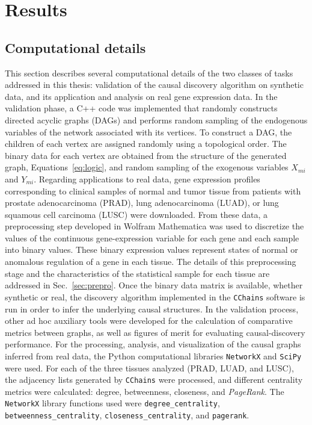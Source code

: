 \documentclass[12pt,a4paper]{report}
\begin{document}
\newpage


\chapter{Results}
\section{Computational details}

This section describes several computational details of the two classes of tasks addressed in this thesis: validation of the causal discovery algorithm on synthetic data, and its application and analysis on real gene expression data. In the validation phase, a C++ code was implemented that randomly constructs directed acyclic graphs (DAGs) and performs random sampling of the endogenous variables of the network associated with its vertices. To construct a DAG, the children of each vertex are assigned randomly using a topological order. The binary data for each vertex are obtained from the structure of the generated graph, Equations~\ref{eq:logic}, and random sampling of the exogenous variables $X_{mi}$ and $Y_{mi}$. Regarding applications to real data, gene expression profiles corresponding to clinical samples of normal and tumor tissue from patients with prostate adenocarcinoma (PRAD), lung adenocarcinoma (LUAD), or lung squamous cell carcinoma (LUSC) were downloaded\cite{prad,luad,lusc}. From these data, a preprocessing step developed in Wolfram Mathematica was used to discretize the values of the continuous gene-expression variable for each gene and each sample into binary values. These binary expression values represent states of normal or anomalous regulation of a gene in each tissue. The details of this preprocessing stage and the characteristics of the statistical sample for each tissue are addressed in Sec.~\ref{sec:prepro}. Once the binary data matrix is available, whether synthetic or real, the discovery algorithm implemented in the \texttt{CChains} software is run in order to infer the underlying causal structures. In the validation process, other ad hoc auxiliary tools were developed for the calculation of comparative metrics between graphs, as well as figures of merit for evaluating causal-discovery performance. For the processing, analysis, and visualization of the causal graphs inferred from real data, the Python computational libraries \texttt{NetworkX} and \texttt{SciPy}\cite{networkx} were used. For each of the three tissues analyzed (PRAD, LUAD, and LUSC), the adjacency lists generated by \texttt{CChains} were processed, and different centrality metrics were calculated: degree, betweenness, closeness, and \textit{PageRank}. The \texttt{NetworkX} library functions used were \texttt{degree\_centrality}, \texttt{betweenness\_centrality}, \texttt{closeness\_centrality}, and \texttt{pagerank}. 
\end{document}
